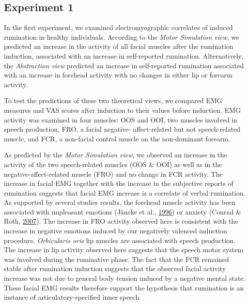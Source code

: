 \documentclass[a4paper,12pt,twoside,openright,oldfontcommands]{memoir}
\begin{document}
\hypertarget{experiment-1}{%
\subsection{Experiment 1}\label{experiment-1}}

In the first experiment, we examined electromyographic correlates of induced rumination in healthy individuals. According to the \emph{Motor Simulation view}, we predicted an increase in the activity of all facial muscles after the rumination induction, associated with an increase in self-reported rumination. Alternatively, the \emph{Abstraction view} predicted an increase in self-reported rumination associated with an increase in forehead activity with no changes in either lip or forearm activity.

To test the predictions of these two theoretical views, we compared EMG measures and VAS scores after induction to their values before induction. EMG activity was examined in four muscles: OOS and OOI, two muscles involved in speech production, FRO, a facial negative- affect-related but not speech-related muscle, and FCR, a non-facial control muscle on the non-dominant forearm.

As predicted by the \emph{Motor Simulation view}, we observed an increase in the activity of the two speech-related muscles (OOS \& OOI) as well as in the negative-affect-related muscle (FRO) and no change in FCR activity. The increase in facial EMG together with the increase in the subjective reports of rumination suggests that facial EMG increase is a correlate of verbal rumination. As supported by several studies results, the forehead muscle activity has been associated with unpleasant emotions (Jäncke et al., \protect\hyperlink{ref-Jancke1996}{1996}) or anxiety (Conrad \& Roth, \protect\hyperlink{ref-conrad_muscle_2007}{2007}). The increase in FRO activity observed here is consistent with the increase in negative emotions induced by our negatively valenced induction procedure. \emph{Orbicularis oris} lip muscles are associated with speech production. The increase in lip activity observed here suggests that the speech motor system was involved during the ruminative phase. The fact that the FCR remained stable after rumination induction suggests that the observed facial activity increase was not due to general body tension induced by a negative mental state. These facial EMG results therefore support the hypothesis that rumination is an instance of articulatory-specified inner speech.
\end{document}
